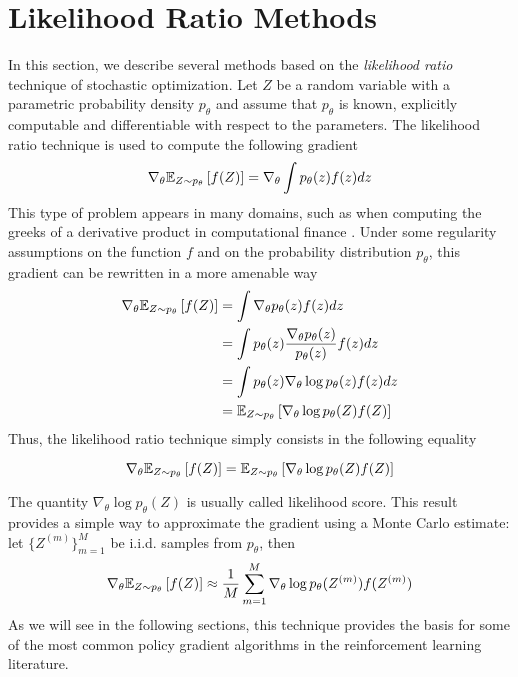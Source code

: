 \section{Likelihood Ratio Methods}
In this section, we describe several methods based on the \emph{likelihood ratio} technique of stochastic optimization. Let $Z$ be a random variable with a parametric probability density $p_\theta$ and assume that $p_\theta$ is known, explicitly computable and differentiable with respect to the parameters. The likelihood ratio technique is used to compute the following gradient
\begin{equation*}
	\nabla_\theta \E[Z \sim p_\theta]{f(Z)} = \nabla_\theta \int p_\theta(z) f(z) dz
\end{equation*}
This type of problem appears in many domains, such as when computing the greeks of a  derivative product in computational finance \cite{pages2016introduction}. Under some regularity assumptions on the function $f$ and on the probability distribution $p_\theta$, this gradient can be rewritten in a more amenable way
\begin{equation*}
	\begin{split}
		\nabla_\theta \E[Z \sim p_\theta]{f(Z)} &= \int \nabla_\theta p_\theta(z) f(z) dz\\
		&= \int p_\theta(z) \frac{\nabla_\theta p_\theta(z)}{p_\theta(z)} f(z) dz\\
		&= \int p_\theta(z) \nabla_\theta \log p_\theta(z) f(z) dz\\
		&= \E[Z\sim p_\theta]{\nabla_\theta \log p_\theta(Z) f(Z)}
	\end{split}
\end{equation*}
Thus, the likelihood ratio technique simply consists in the following equality
\begin{proposition}
\begin{equation}
	\nabla_\theta \E[Z \sim p_\theta]{f(Z)} = \E[Z\sim p_\theta]{\nabla_\theta \log p_\theta(Z) f(Z)}
\end{equation}
\end{proposition}
The quantity $\nabla_\theta \log p_\theta(Z)$ is usually called likelihood score. This result provides a simple way to approximate the gradient using a Monte Carlo estimate: let $\{Z^{(m)}\}_{m=1}^M$ be i.i.d. samples from $p_\theta$, then 
\begin{equation}
	\nabla_\theta \E[Z \sim p_\theta]{f(Z)} \approx \frac{1}{M} \sum_{m=1}^M \nabla_\theta \log p_\theta(Z^{(m)}) f(Z^{(m)})	
\end{equation}
As we will see in the following sections, this technique provides the basis for some of the most common policy gradient algorithms in the reinforcement learning literature. 

